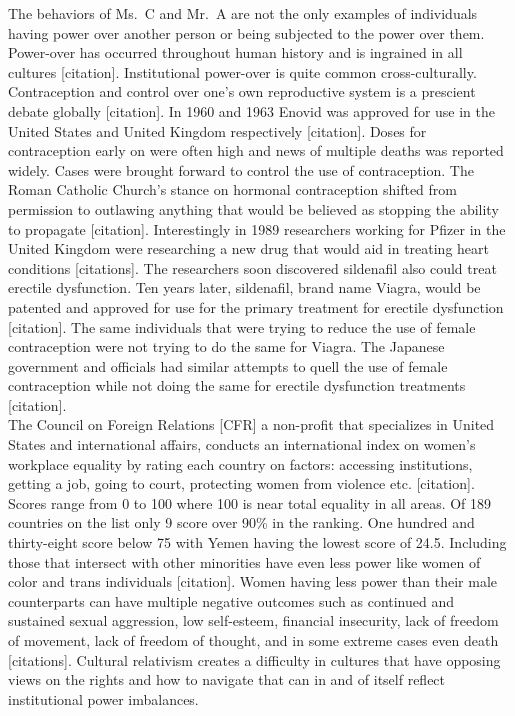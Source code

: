 \documentclass[
  english,
  donotrepeattitle,doc, 12pt, a4paper,floatsintext]{apa7}
\begin{document}
The behaviors of Ms.~C and Mr.~A are not the only examples of individuals having power over another person or being subjected to the power over them. Power-over has occurred throughout human history and is ingrained in all cultures {[}citation{]}. Institutional power-over is quite common cross-culturally. Contraception and control over one's own reproductive system is a prescient debate globally {[}citation{]}. In 1960 and 1963 Enovid was approved for use in the United States and United Kingdom respectively {[}citation{]}. Doses for contraception early on were often high and news of multiple deaths was reported widely. Cases were brought forward to control the use of contraception. The Roman Catholic Church's stance on hormonal contraception shifted from permission to outlawing anything that would be believed as stopping the ability to propagate {[}citation{]}. Interestingly in 1989 researchers working for Pfizer in the United Kingdom were researching a new drug that would aid in treating heart conditions {[}citations{]}. The researchers soon discovered sildenafil also could treat erectile dysfunction. Ten years later, sildenafil, brand name Viagra, would be patented and approved for use for the primary treatment for erectile dysfunction {[}citation{]}. The same individuals that were trying to reduce the use of female contraception were not trying to do the same for Viagra. The Japanese government and officials had similar attempts to quell the use of female contraception while not doing the same for erectile dysfunction treatments {[}citation{]}.\\
The Council on Foreign Relations {[}CFR{]} a non-profit that specializes in United States and international affairs, conducts an international index on women's workplace equality by rating each country on factors: accessing institutions, getting a job, going to court, protecting women from violence etc. {[}citation{]}. Scores range from 0 to 100 where 100 is near total equality in all areas. Of 189 countries on the list only 9 score over 90\% in the ranking. One hundred and thirty-eight score below 75 with Yemen having the lowest score of 24.5. Including those that intersect with other minorities have even less power like women of color and trans individuals {[}citation{]}. Women having less power than their male counterparts can have multiple negative outcomes such as continued and sustained sexual aggression, low self-esteem, financial insecurity, lack of freedom of movement, lack of freedom of thought, and in some extreme cases even death {[}citations{]}. Cultural relativism creates a difficulty in cultures that have opposing views on the rights and how to navigate that can in and of itself reflect institutional power imbalances.
\end{document}
